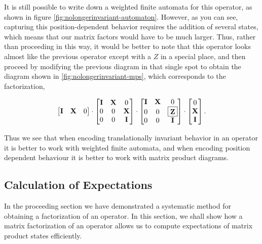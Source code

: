 \documentclass{amsbook}
\theoremstyle{plain}
\theoremstyle{definition}
\theoremstyle{remark}
\begin{document}
It is still possible to write down a weighted finite automata for this operator, as shown in figure \ref{fig:nolongerinvariant-automaton}.  However, as you can see, capturing this position-dependent behavior requires the addition of several states, which means that our matrix factors would have to be much larger.  Thus, rather than proceeding in this way, it would be better to note that this operator looks almost like the previous operator except with a $Z$ in a special place, and then proceed by modifying the previous diagram in that single spot to obtain the diagram shown in \ref{fig:nolongerinvariant-mps}, which corresponds to the factorization,

$$
\begin{bmatrix}
\textbf{I} & \textbf{X} & 0 \\
\end{bmatrix}
\cdot
\begin{bmatrix}
\textbf{I} & \textbf{X} & 0 \\
0 & 0 & \textbf{X} \\
0 & 0 & \textbf{I} \\
\end{bmatrix}
\cdot
\begin{bmatrix}
\textbf{I} & \textbf{X} & 0 \\
0 & 0 & \fbox{\textbf{Z}} \\
0 & 0 & \textbf{I} \\
\end{bmatrix}
\cdot
\begin{bmatrix}
0 \\
\textbf{X} \\
\textbf{I} \\
\end{bmatrix}.
$$

Thus we see that when encoding translationally invariant behavior in an operator it is better to work with weighted finite automata, and when encoding position dependent behaviour it is better to work with matrix product diagrams.
\subsection{Calculation of Expectations}

\label{calcexp}

In the proceeding section we have demonstrated a systematic method for obtaining a factorization of an operator.  In this section, we shall show how a matrix factorization of an operator allows us to compute expectations of matrix product states efficiently.
\end{document}

